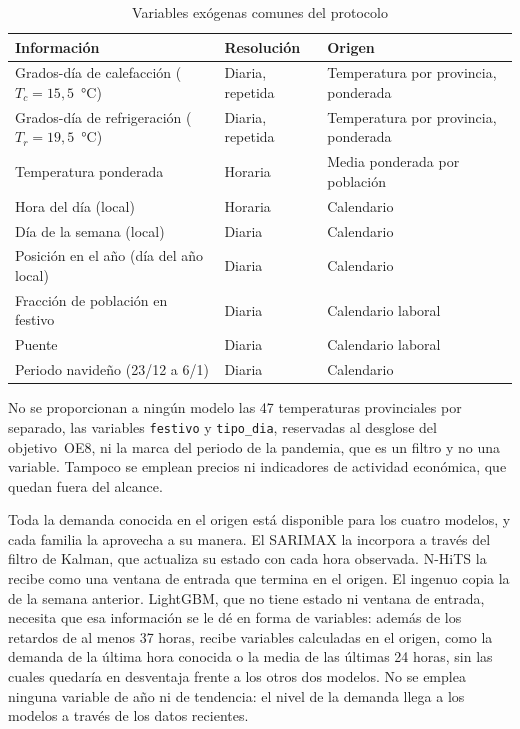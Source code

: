 \begin{table}[htbp]
	\centering
	\caption{Variables exógenas comunes del protocolo}
	\label{tab:exogenas}
	\small
	\begin{tabularx}{\textwidth}{>{\raggedright\arraybackslash}p{5.2cm} >{\raggedright\arraybackslash}p{2.6cm} >{\raggedright\arraybackslash}X}
		\hline
		\textbf{Información} & \textbf{Resolución} & \textbf{Origen} \\
		\hline
		Grados-día de calefacción ($T_c = 15{,}5$~°C) & Diaria, repetida & Temperatura por provincia, ponderada \\
		Grados-día de refrigeración ($T_r = 19{,}5$~°C) & Diaria, repetida & Temperatura por provincia, ponderada \\
		Temperatura ponderada & Horaria & Media ponderada por población \\
		Hora del día (local) & Horaria & Calendario \\
		Día de la semana (local) & Diaria & Calendario \\
		Posición en el año (día del año local) & Diaria & Calendario \\
		Fracción de población en festivo & Diaria & Calendario laboral \\
		Puente & Diaria & Calendario laboral \\
		Periodo navideño (23/12 a 6/1) & Diaria & Calendario \\
		\hline
	\end{tabularx}
\end{table}

No se proporcionan a ningún modelo las 47 temperaturas provinciales por
separado, las variables \texttt{festivo} y \texttt{tipo\_dia}, reservadas al
desglose del objetivo~OE8, ni la marca del periodo de la pandemia, que es un
filtro y no una variable. Tampoco se emplean precios ni indicadores de
actividad económica, que quedan fuera del alcance.

Toda la demanda conocida en el origen está disponible para los cuatro
modelos, y cada familia la aprovecha a su manera. El SARIMAX la incorpora a
través del filtro de Kalman, que actualiza su estado con cada hora observada.
N-HiTS la recibe como una ventana de entrada que termina en el origen. El
ingenuo copia la de la semana anterior. LightGBM, que no tiene estado ni
ventana de entrada, necesita que esa información se le dé en forma de
variables: además de los retardos de al menos 37 horas, recibe variables
calculadas en el origen, como la demanda de la última hora conocida o la
media de las últimas 24 horas, sin las cuales quedaría en desventaja frente a
los otros dos modelos. No se emplea ninguna variable de año ni de tendencia:
el nivel de la demanda llega a los modelos a través de los datos recientes.


